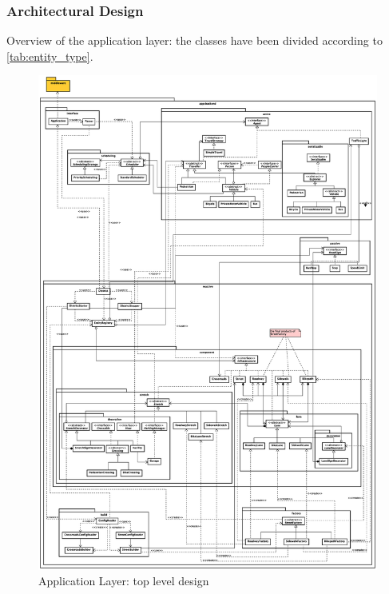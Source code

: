 \subsubsection{Architectural Design}
Overview of the application layer: the classes have been divided according to
\ref{tab:entity_type}.
\begin{figure}[H]
  \centering
  \includegraphics[width=.95\columnwidth]{images/solution/app/backend/app_backend_architecture.eps}
  \caption{Application Layer: top level design}
  \label{fig:sd-app-backend-architecture}
\end{figure}

